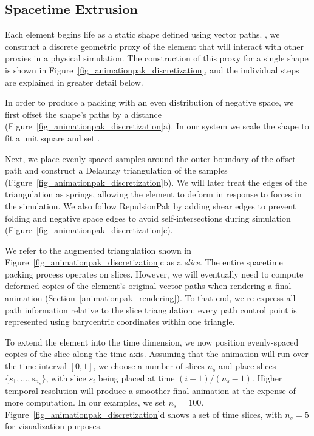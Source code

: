 \subsection{Spacetime Extrusion}
\label{animationpak_spacetime_extrusion}

Each element begins life as a static shape defined using
vector paths.  , we construct a discrete
geometric proxy of the element that will interact with other
proxies in a physical simulation.  The construction of this proxy
for a single shape is shown in Figure~\ref{fig_animationpak_discretization}, and
the individual steps are explained in greater detail below.

In order to produce a packing with an even distribution of negative
space, we first offset the shape's paths by a distance 
(Figure~\ref{fig_animationpak_discretization}a).  In our system
we scale the shape to fit a unit square and set .

\newtext
{
Next, we place evenly-spaced samples around the outer boundary of 
the offset path and construct a Delaunay triangulation of the samples
(Figure~\ref{fig_animationpak_discretization}b). We will
later treat the edges of the triangulation as springs, allowing the
element to deform in response to forces in the simulation.  
We also follow RepulsionPak by adding shear edges to prevent
folding and negative space edges to avoid self-intersections during simulation
(Figure~\ref{fig_animationpak_discretization}c).
}

We refer to the augmented triangulation shown in 
Figure~\ref{fig_animationpak_discretization}c as a \textit{slice}.  
The entire spacetime packing process operates on slices.  
However, we will eventually
need to compute deformed copies of the element's original vector paths 
when rendering a final animation (Section~\ref{animationpak_rendering}).
To that end, we re-express all path information relative to the
slice triangulation: every path control point is represented using
barycentric coordinates within one triangle.

To extend the element into the time dimension, 
we now position evenly-spaced copies of the slice along the time axis.
Assuming that the animation will run over the time interval $[0,1]$, 
we choose a number of slices $n_s$ and place slices $\{s_1,\ldots,s_{n_s}\}$,
with slice $s_i$ being placed at time $(i-1)/(n_s-1)$.
Higher temporal resolution will
produce a smoother final animation at the expense of more computation.
In our examples, we set $n_s=100$. 
Figure~\ref{fig_animationpak_discretization}d shows a set of time slices, with
$n_s=5$ for visualization purposes.

